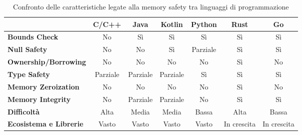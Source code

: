 
\small
\setlength{\tabcolsep}{4pt}
\begin{table}[H]
  \centering
  \begin{tabular}{l|c|c|c|c|c|c|}
    \multicolumn{1}{l}{}                       & \textbf{C/C++}                & \textbf{Java}                 & \textbf{Kotlin}               & \textbf{Python}               & \textbf{Rust}                       & \textbf{Go}                      \\
    \hline
    \textbf{Bounds Check}                      & \cellcolor{red!20}No          & \cellcolor{green!20}Sì        & \cellcolor{green!20}Sì        & \cellcolor{green!20}Sì        & \cellcolor{green!20}Sì              & \cellcolor{green!20}Sì           \\
    \textbf{Null Safety}                       & \cellcolor{red!20}No          & \cellcolor{red!20}No          & \cellcolor{green!20}Sì        & \cellcolor{yellow!20}Parziale & \cellcolor{green!20}Sì              & \cellcolor{green!20}Sì           \\
    \textbf{Ownership/Borrowing}               & \cellcolor{red!20}No          & \cellcolor{red!20}No          & \cellcolor{red!20}No          & \cellcolor{red!20}No          & \cellcolor{green!20}Sì              & \cellcolor{red!20}No             \\
    \textbf{Type Safety}                       & \cellcolor{yellow!20}Parziale & \cellcolor{yellow!20}Parziale & \cellcolor{yellow!20}Parziale & \cellcolor{green!20}Sì        & \cellcolor{green!20}Sì              & \cellcolor{green!20}Sì           \\
    \textbf{Memory Zeroization}                & \cellcolor{red!20}No          & \cellcolor{red!20}No          & \cellcolor{red!20}No          & \cellcolor{red!20}No          & \cellcolor{green!20}Sì\footnotemark & \cellcolor{red!20}No             \\
    \textbf{Memory Integrity}                  & \cellcolor{red!20}No          & \cellcolor{yellow!20}Parziale & \cellcolor{yellow!20}Parziale & \cellcolor{red!20}No          & \cellcolor{green!20}Sì              & \cellcolor{green!20}Sì           \\
    \hline
    \textbf{Difficoltà}~\cite{learning_curves} & \cellcolor{red!20}Alta        & \cellcolor{yellow!20}Media    & \cellcolor{yellow!20}Media    & \cellcolor{green!20}Bassa     & \cellcolor{red!20}Alta              & \cellcolor{green!20}Bassa        \\
    \textbf{Ecosistema e Librerie}             & \cellcolor{green!20}Vasto     & \cellcolor{green!20}Vasto     & \cellcolor{green!20}Vasto     & \cellcolor{green!20}Vasto     & \cellcolor{yellow!20}In crescita    & \cellcolor{yellow!20}In crescita \\
    \hline
  \end{tabular}
  \caption{Confronto delle caratteristiche legate alla memory safety tra
  linguaggi di programmazione}
  \label{tab:linguaggi_memory_safety}
\end{table}

